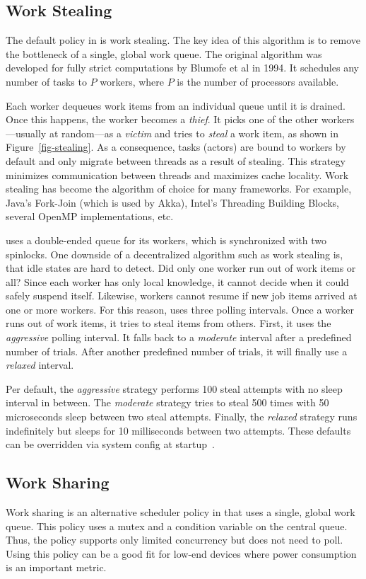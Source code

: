 \subsection{Work Stealing}
\label{work-stealing}

The default policy in \lib is work stealing. The key idea of this algorithm is to remove the bottleneck of a single, global work queue.  The original algorithm was developed for fully strict computations by Blumofe et al in 1994. It schedules any number of tasks to $P$ workers, where $P$ is the number of processors available.


Each worker dequeues work items from an individual queue until it is drained. Once this happens, the worker becomes a \emph{thief}. It picks one of the other workers---usually at random---as a \emph{victim} and tries to \emph{steal} a work item, as shown in Figure~\ref{fig-stealing}. As a consequence, tasks (actors) are bound to workers by default and only migrate between threads as a result of stealing. This strategy minimizes communication between threads and maximizes cache locality. Work stealing has become the algorithm of choice for many frameworks. For example, Java's Fork-Join (which is used by Akka), Intel's Threading Building Blocks, several OpenMP implementations, etc.

\lib uses a double-ended queue for its workers, which is synchronized with two spinlocks. One downside of a decentralized algorithm such as work stealing is, that idle states are hard to detect. Did only one worker run out of work items or all? Since each worker has only local knowledge, it cannot decide when it could safely suspend itself. Likewise, workers cannot resume if new job items arrived at one or more workers. For this reason, \lib uses three polling intervals. Once a worker runs out of work items, it tries to steal items from others. First, it uses the \emph{aggressive} polling interval. It falls back to a \emph{moderate} interval after a predefined number of trials. After another predefined number of trials, it will finally use a \emph{relaxed} interval.

Per default, the \emph{aggressive} strategy performs 100 steal attempts with no sleep interval in between. The \emph{moderate} strategy tries to steal 500 times with 50 microseconds sleep between two steal attempts. Finally, the \emph{relaxed} strategy runs indefinitely but sleeps for 10 milliseconds between two attempts. These defaults can be overridden via system config at startup~.

\subsection{Work Sharing}
\label{work-sharing}

Work sharing is an alternative scheduler policy in \lib that uses a single, global work queue. This policy uses a mutex and a condition variable on the central queue. Thus, the policy supports only limited concurrency but does not need to poll. Using this policy can be a good fit for low-end devices where power consumption is an important metric.


